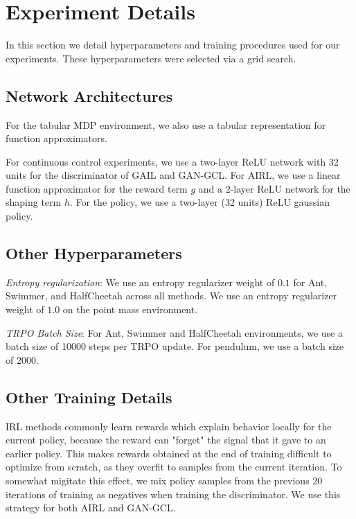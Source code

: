 \documentclass{article} \usepackage{iclr2018_conference,times}
\begin{document}
\section{Experiment Details}
\label{app:hyperparams}
In this section we detail hyperparameters and training procedures used for our experiments. These hyperparameters were selected via a grid search.

\subsection{Network Architectures}
For the tabular MDP environment, we also use a tabular representation for function approximators.

For continuous control experiments, we use a two-layer ReLU network with 32 units for the discriminator of GAIL and GAN-GCL. For AIRL, we use a linear function approximator for the reward term $g$ and a 2-layer ReLU network for the shaping term $h$. For the policy, we use a two-layer (32 units) ReLU gaussian policy.

\subsection{Other Hyperparameters}
\textit{Entropy regularization}: We use an entropy regularizer weight of $0.1$ for Ant, Swimmer, and HalfCheetah across all methods. We use an entropy regularizer weight of $1.0$ on the point mass environment.

\textit{TRPO Batch Size}: For Ant, Swimmer and HalfCheetah environments, we use a batch size of 10000 steps per TRPO update. For pendulum, we use a batch size of 2000.

\subsection{Other Training Details}
IRL methods commonly learn rewards which explain behavior locally for the current policy, because the reward can "forget" the signal that it gave to an earlier policy. This makes rewards obtained at the end of training difficult to optimize from scratch, as they overfit to samples from the current iteration. To somewhat migitate this effect, we mix policy samples from the previous 20 iterations of training as negatives when training the discriminator. We use this strategy for both AIRL and GAN-GCL.




 
\end{document}

